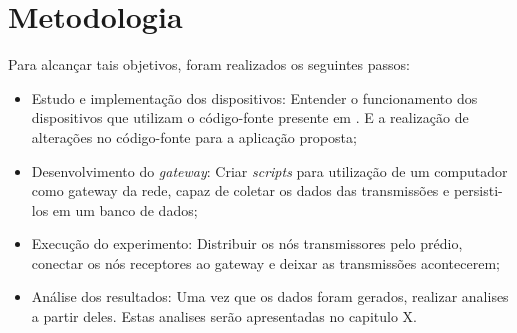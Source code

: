 \section{Metodologia}
\label{sec:metodologia}
Para alcançar tais objetivos, foram realizados os seguintes passos:


\begin{itemize}
    \item Estudo e implementação dos dispositivos: Entender o funcionamento dos dispositivos que utilizam o código-fonte presente em \cite{openmoteb-firmware}. E a realização de alterações no código-fonte para a aplicação proposta;
    \item Desenvolvimento do \emph{gateway}: Criar \emph{scripts} para utilização de um computador como gateway da rede, capaz de coletar os dados das transmissões e persisti-los em um banco de dados;
    \item Execução do experimento: Distribuir os nós transmissores pelo prédio, conectar os nós receptores ao gateway e deixar as transmissões acontecerem;
    \item Análise dos resultados: Uma vez que os dados foram gerados, realizar analises a partir deles. Estas analises serão apresentadas no capitulo X.
\end{itemize}

